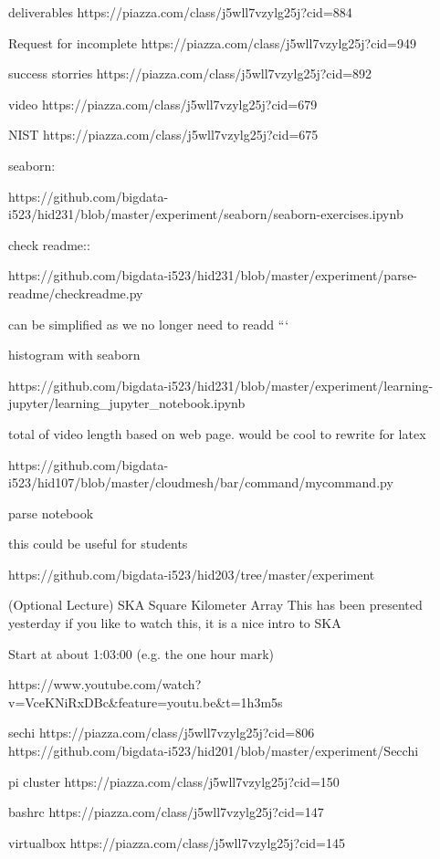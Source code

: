 deliverables
https://piazza.com/class/j5wll7vzylg25j?cid=884

Request for incomplete
https://piazza.com/class/j5wll7vzylg25j?cid=949

success storries
https://piazza.com/class/j5wll7vzylg25j?cid=892

video
https://piazza.com/class/j5wll7vzylg25j?cid=679

NIST
https://piazza.com/class/j5wll7vzylg25j?cid=675

seaborn:

https://github.com/bigdata-i523/hid231/blob/master/experiment/seaborn/seaborn-exercises.ipynb


check readme::

https://github.com/bigdata-i523/hid231/blob/master/experiment/parse-readme/checkreadme.py

can be simplified as we no longer need to readd ```


histogram with seaborn

https://github.com/bigdata-i523/hid231/blob/master/experiment/learning-jupyter/learning_jupyter_notebook.ipynb


total of video length based on web page. would be cool to rewrite for latex 

https://github.com/bigdata-i523/hid107/blob/master/cloudmesh/bar/command/mycommand.py

parse notebook

this could be useful for students

https://github.com/bigdata-i523/hid203/tree/master/experiment


(Optional Lecture) SKA Square Kilometer Array
This has been presented yesterday if you like to watch this, it is a nice intro to SKA

 

Start at about 1:03:00 (e.g. the one hour mark)

 

https://www.youtube.com/watch?v=VceKNiRxDBc&feature=youtu.be&t=1h3m5s 

sechi
https://piazza.com/class/j5wll7vzylg25j?cid=806
https://github.com/bigdata-i523/hid201/blob/master/experiment/Secchi%


pi cluster
https://piazza.com/class/j5wll7vzylg25j?cid=150

bashrc
https://piazza.com/class/j5wll7vzylg25j?cid=147

virtualbox
https://piazza.com/class/j5wll7vzylg25j?cid=145

